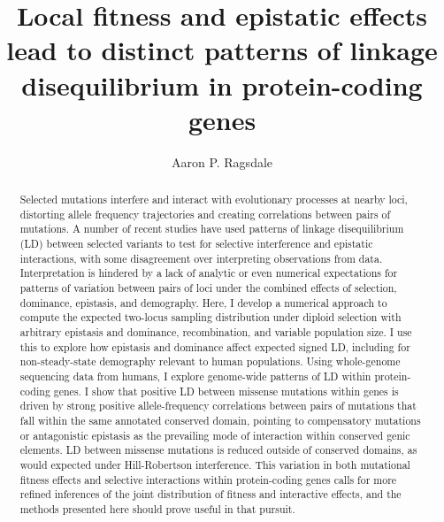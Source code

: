 \documentclass[]{article}
\begin{document}
\title{Local fitness and epistatic effects lead to distinct patterns of linkage disequilibrium in protein-coding genes}
\author[]{Aaron P. Ragsdale}
\maketitle


\begin{abstract}

Selected mutations interfere and interact with evolutionary processes at nearby
loci, distorting allele frequency trajectories and creating correlations
between pairs of mutations. A number of recent studies have used patterns of
linkage disequilibrium (LD) between selected variants to test for selective
interference and epistatic interactions, with some disagreement over
interpreting observations from data. Interpretation is hindered by a lack of
analytic or even numerical expectations for patterns of variation between pairs
of loci under the combined effects of selection, dominance, epistasis, and
demography. Here, I develop a numerical approach to compute the expected
two-locus sampling distribution under diploid selection with arbitrary
epistasis and dominance, recombination, and variable population size. I use
this to explore how epistasis and dominance affect expected signed LD,
including for non-steady-state demography relevant to human populations. Using
whole-genome sequencing data from humans, I explore genome-wide patterns of LD
within protein-coding genes. I show that positive LD between missense mutations
within genes is driven by strong positive allele-frequency correlations between
pairs of mutations that fall within the same annotated conserved domain,
pointing to compensatory mutations or antagonistic epistasis as the prevailing
mode of interaction within conserved genic elements. LD between missense
mutations is reduced outside of conserved domains, as would expected under
Hill-Robertson interference. This variation in both mutational fitness effects
and selective interactions within protein-coding genes calls for more refined
inferences of the joint distribution of fitness and interactive effects, and
the methods presented here should prove useful in that pursuit.

\end{abstract}
\end{document}
